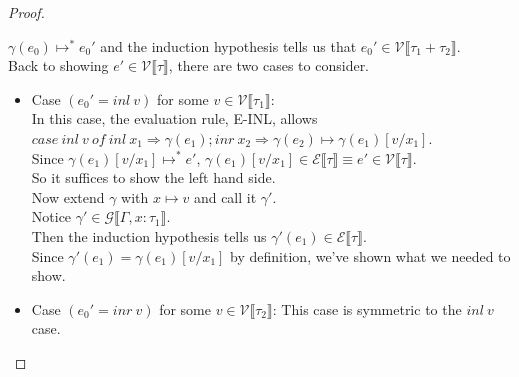 \documentclass{article}
\begin{document}
\begin{proof}
\begin{itemize}
\begin{itemize}
  $\gamma(e_0) \mapsto^* e_0'$ and the induction hypothesis tells us that $e_0' \in \mathcal{V} \llbracket \tau_1 + \tau_2 \rrbracket$.\\
  Back to showing $e' \in \mathcal{V} \llbracket \tau \rrbracket$, there are two cases to consider.
  \begin{itemize}
  \item Case $(e_0' = inl~v)$ for some $v \in \mathcal{V} \llbracket \tau_1 \rrbracket$:\\
    In this case, the evaluation rule, E-INL, allows\\
    $case~inl~v~of~inl~x_1 \Rightarrow \gamma(e_1); inr~x_2 \Rightarrow \gamma(e_2) \mapsto \gamma(e_1)[v/x_1]$.\\
    Since $\gamma(e_1)[v/x_1] \mapsto^* e'$, $\gamma(e_1)[v/x_1] \in \mathcal{E} \llbracket \tau \rrbracket \equiv e' \in \mathcal{V} \llbracket \tau \rrbracket$.\\
    So it suffices to show the left hand side.\\
    Now extend $\gamma$ with $x \mapsto v$ and call it $\gamma'$.\\
    Notice $\gamma' \in \mathcal{G} \llbracket \Gamma, x:\tau_1 \rrbracket$.\\
    Then the induction hypothesis tells us $\gamma'(e_1) \in \mathcal{E} \llbracket \tau \rrbracket$.\\
    Since $\gamma'(e_1) = \gamma(e_1)[v/x_1]$ by definition, we've shown what we needed to show.\\
    
  \item Case $(e_0' = inr~v)$ for some $v \in \mathcal{V} \llbracket \tau_2 \rrbracket$: This case is symmetric to the $inl~v$ case.
  \end{itemize}

\end{itemize}
\end{itemize}

\end{proof}



 
\end{document}
